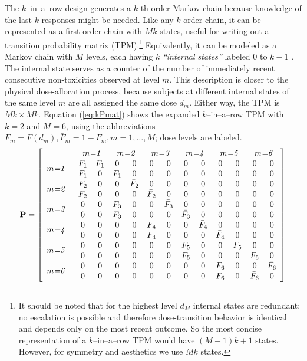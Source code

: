 The $k$--in--a--row design generates a $k$-th order Markov chain because knowledge of the last $k$ responses might be needed. Like any $k$-order chain, it can be represented as a first-order chain with $Mk$ states, useful for writing out a transition probability matrix (TPM).\footnote{It should be noted that for the highest level $d_M$ internal states are redundant: no escalation is possible and therefore dose-transition behavior is identical and depends only on the most recent outcome. So the most concise representation of a $k$--in--a--row TPM would have $(M-1)k+1$ states. However, for symmetry and aesthetics we use $Mk$ states.} Equivalently,  it can be modeled as a Markov chain with $M$ levels, each having $k$ \emph{``internal states''} labeled $0$ to $k-1$ \citep{Oron:Hoff:thek:2009,Weiss:Aspe:1994}. The internal state serves as a counter of the number of immediately recent consecutive non-toxicities observed at level $m$. This description is closer to the physical dose-allocation process, because subjects at different internal states of the same level $m$ are all assigned the same dose $d_m$. Either way, the TPM is $Mk\times Mk$. Equation (\ref{eq:kPmat}) shows the expanded $k$--in--a--row TPM with $k=2$ and $M=6$, using the abbreviations $F_m=F\left(d_m\right),\bar{F}_m=1-F_m, m=1,\ldots,M$; dose levels are labeled.
%
\begin{equation}\label{eq:kPmat}
\mathbf{P}=\left[\begin{array}{p{1cm}cccccccccccc}
& \multicolumn{2}{c}{\emph{$m$=1}} & \multicolumn{2}{c}{\emph{$m$=2}}& \multicolumn{2}{c}{\emph{$m$=3}}& \multicolumn{2}{c}{\emph{$m$=4}}& \multicolumn{2}{c}{\emph{$m$=5}}& \multicolumn{2}{c}{\emph{$m$=6}} \\
  \multirow{2}{*}{\emph{$m$=1}} &  F_1 &\bar{F}_1 &0 &0 &0 &0 &0 &0 &0 &0 &0 & 0\\
   &  F_1 &0         &\bar{F}_1 &0 &0 &0 &0 &0 &0 &0 &0& 0\\
  \multirow{2}{*}{\emph{$m$=2}} &  F_2 &0 &0 &\bar{F}_2 &0 &0 &0 &0 &0 &0 &0& 0\\
 &   F_2 &0 &0 &0 &\bar{F}_2  &0 &0 &0 &0 &0 &0& 0\\
  \multirow{2}{*}{\emph{$m$=3}} &  0    &0 &F_3 &0 &0   &\bar{F}_3 &0 &0 &0 &0 &0& 0\\
  &  0    &0 &F_3 &0 &0   &0 &\bar{F}_3 &0 &0 &0 &0& 0\\
  \multirow{2}{*}{\emph{$m$=4}} &  0    &0 &0   &0 &F_4 &0 & 0&\bar{F}_4 &0 &0 &0 &0\\
  &  0    &0 &0   &0 &F_4 &0 &0      & 0   &\bar{F}_4 &0 &0 &0\\
  \multirow{2}{*}{\emph{$m$=5}} &  0    &0 &0   &0 &0   &0 &F_5    & 0   &0 &\bar{F}_5 &0 &0\\
  &  0    &0 &0   &0 &0   &0 &F_5    & 0   &0 &0 &\bar{F}_5 &0\\
 \multirow{2}{*}{\emph{$m$=6}} &   0    &0 &0   &0 &0   &0 &0         &0 &F_6 &0 & 0&\bar{F}_6\\
  &  0    &0 &0   &0 &0   &0 &0         &0 &F_6 & 0 &\bar{F}_6 & 0\\
\end{array}\right]
\end{equation}
